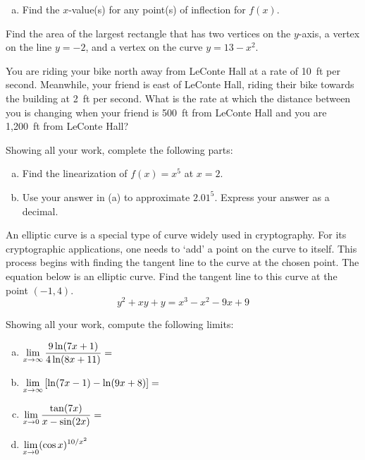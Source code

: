\documentclass[12pt,letterpaper]{exam}
\begin{document}
\begin{questions}
\begin{enumerate}[(a)]
	\item Find the $x$-value(s) for any point(s) of inflection for $f(x)$. \vfill

	\end{enumerate}



\newpage
\question[16] Find the area of the largest rectangle that has two vertices on the $y$-axis, a vertex on the line $y= -2$, and a vertex on the curve $y= 13 - x^2$. 



\newpage
\question[16] You are riding your bike north away from LeConte Hall at a rate of 10~ft per second. Meanwhile, your friend is east of LeConte Hall, riding their bike towards the building at 2~ft per second. What is the rate at which the distance between you is changing when your friend is 500~ft from LeConte Hall and you are 1,200~ft from LeConte Hall?



\newpage
\question[16] Showing all your work, complete the following parts:
	\begin{enumerate}[(a)]
	\item Find the linearization of $f(x)= x^5$ at $x= 2$. \vspace{4cm}\vfill
	\item Use your answer in (a) to approximate $2.01^5$. Express your answer as a decimal. \vfill
	\end{enumerate}



\newpage
\question[16] An elliptic curve is a special type of curve widely used in cryptography. For its cryptographic applications, one needs to `add' a point on the curve to itself. This process begins with finding the tangent line to the curve at the chosen point. The equation below is an elliptic curve. Find the tangent line to this curve at the point $(-1, 4)$.
	\[
	y^2 + xy + y= x^3 - x^2 - 9x + 9
	\]



\newpage
\question[16] Showing all your work, compute the following limits: \par\vspace{0.3cm}
	\begin{enumerate}[(a)]
	\item $\displaystyle\lim_{x \to \infty} \dfrac{9 \ln(7x + 1)}{4 \ln(8x + 11)}=$ \vfill
	\item $\displaystyle\lim_{x \to \infty} \left[ \ln(7x - 1) - \ln(9x + 8) \right]=$ \vfill
	
	\newpage
	
	\phantom{} \par
	\item $\displaystyle\lim_{x \to 0} \dfrac{\tan(7x)}{x - \sin(2x)}=$ \par\vspace{6cm}
	\item $\displaystyle\lim_{x \to 0} (\cos x)^{10/x^2}$ \vfill
	\end{enumerate}

\end{questions}
\end{document}
